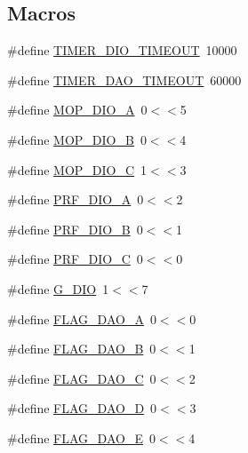 \subsection*{Macros}
\begin{DoxyCompactItemize}
\item 
\#define \hyperlink{group___i_c_m_pv6_r_p_l_ga8f668655ebf626020f3d47b5dc13cbdc}{T\+I\+M\+E\+R\+\_\+\+D\+I\+O\+\_\+\+T\+I\+M\+E\+O\+UT}~10000
\item 
\#define \hyperlink{group___i_c_m_pv6_r_p_l_gae5deb3ed0de2ef56f3f87f1acf48ed13}{T\+I\+M\+E\+R\+\_\+\+D\+A\+O\+\_\+\+T\+I\+M\+E\+O\+UT}~60000
\item 
\#define \hyperlink{group___i_c_m_pv6_r_p_l_ga1ae12caee968b3c4346355e6edc2fa1b}{M\+O\+P\+\_\+\+D\+I\+O\+\_\+A}~0$<$$<$5
\item 
\#define \hyperlink{group___i_c_m_pv6_r_p_l_ga68b9b921efc360503f32f9b2f31b064a}{M\+O\+P\+\_\+\+D\+I\+O\+\_\+B}~0$<$$<$4
\item 
\#define \hyperlink{group___i_c_m_pv6_r_p_l_ga70ade50f3dfe2b0767fa0ef979dea533}{M\+O\+P\+\_\+\+D\+I\+O\+\_\+C}~1$<$$<$3
\item 
\#define \hyperlink{group___i_c_m_pv6_r_p_l_ga101deca1213d48043ebd5fb56dca59c8}{P\+R\+F\+\_\+\+D\+I\+O\+\_\+A}~0$<$$<$2
\item 
\#define \hyperlink{group___i_c_m_pv6_r_p_l_gad50d0d75312868a94e6bfab9748657aa}{P\+R\+F\+\_\+\+D\+I\+O\+\_\+B}~0$<$$<$1
\item 
\#define \hyperlink{group___i_c_m_pv6_r_p_l_gace28fefe40fbc4606b90d1ba79fa4cb7}{P\+R\+F\+\_\+\+D\+I\+O\+\_\+C}~0$<$$<$0
\item 
\#define \hyperlink{group___i_c_m_pv6_r_p_l_gac5915be92309eeeca33a95c1ec2d0d89}{G\+\_\+\+D\+IO}~1$<$$<$7
\item 
\#define \hyperlink{group___i_c_m_pv6_r_p_l_ga591dd0fee34c7ca9c896973b1fa6f708}{F\+L\+A\+G\+\_\+\+D\+A\+O\+\_\+A}~0$<$$<$0
\item 
\#define \hyperlink{group___i_c_m_pv6_r_p_l_ga103f1018a7172b0057cb7f7cdf99b73d}{F\+L\+A\+G\+\_\+\+D\+A\+O\+\_\+B}~0$<$$<$1
\item 
\#define \hyperlink{group___i_c_m_pv6_r_p_l_ga632c7da594f4707aa92fe4235d8ca4c7}{F\+L\+A\+G\+\_\+\+D\+A\+O\+\_\+C}~0$<$$<$2
\item 
\#define \hyperlink{group___i_c_m_pv6_r_p_l_ga01f7a6ba5364891a303a8e725a170d12}{F\+L\+A\+G\+\_\+\+D\+A\+O\+\_\+D}~0$<$$<$3
\item 
\#define \hyperlink{group___i_c_m_pv6_r_p_l_ga106e764d5a7f433bf137362780da4ec8}{F\+L\+A\+G\+\_\+\+D\+A\+O\+\_\+E}~0$<$$<$4

\end{DoxyCompactItemize}
